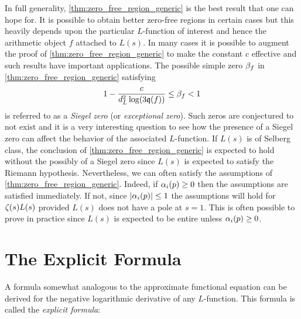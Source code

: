 \documentclass[12pt]{article}
\begin{document}
    In full generality, \cref{thm:zero_free_region_generic} is the best result that one can hope for. It is possible to obtain better zero-free regions in certain cases but this heavily depends upon the particular \(L\)-function of interest and hence the arithmetic object \(f\) attached to \(L(s)\). In many cases it is possible to augment the proof of \cref{thm:zero_free_region_generic} to make the constant \(c\) effective and such results have important applications. The possible simple zero \(\beta_{f}\) in \cref{thm:zero_free_region_generic} satisfying
    \[
      1-\frac{c}{d_{L}^{2}\log(3\mathfrak{q}(f))} \le \beta_{f} < 1
    \]
    is referred to as a \textit{Siegel zero} (or \textit{exceptional zero}). Such zeros are conjectured to not exist and it is a very interesting question to see how the presence of a Siegel zero can affect the behavior of the associated \(L\)-function. If \(L(s)\) is of Selberg class, the conclusion of \cref{thm:zero_free_region_generic} is expected to hold without the possibly of a Siegel zero since \(L(s)\) is expected to satisfy the Riemann hypothesis. Nevertheless, we can often satisfy the assumptions of \cref{thm:zero_free_region_generic}. Indeed, if \(\alpha_{i}(p) \ge 0\) then the assumptions are satisfied immediately. If not, since \(|\alpha_{i}(p)| \le 1\) the assumptions will hold for \(\zeta(s)L(s)\) provided \(L(s)\) does not have a pole at \(s = 1\). This is often possible to prove in practice since \(L(s)\) is expected to be entire unless \(\alpha_{i}(p) \ge 0\).
  \section{The Explicit Formula}
    A formula somewhat analogous to the approximate functional equation can be derived for the negative logarithmic derivative of any \(L\)-function. This formula is called the \textit{explicit formula}:
\end{document}
